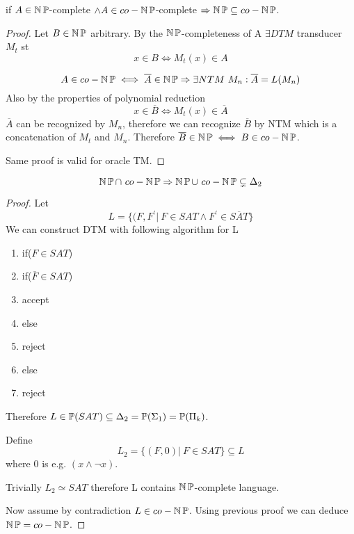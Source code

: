 \begin{theorem}[NP = co-NP]
	if $A \in \TNP$-complete $\land A \in co-\TNP$-complete $\Rightarrow \TNP \subseteq co-\TNP$.
\end{theorem}
\begin{proof}
	Let $B \in \TNP$ arbitrary.
	By the $\TNP$-completeness of A $\exists DTM$ transducer $M_t$ st
	\[ x \in B \iff M_t(x) \in A \]

	\[ A \in co-\TNP \iff \overline{A} \in \TNP \Rightarrow \exists NTM\ M_n: \overline{A} = L(M_n) \]
	Also by the properties of polynomial reduction
	\[ x \in \overline{B} \iff M_t(x) \in \overline{A} \]
	$\overline{A}$ can be recognized by $M_n$, therefore we can recognize $\overline{B}$ by NTM which is a concatenation of $M_t$ and $M_n$.
	Therefore $\overline{B} \in \TNP \iff B \in co-\TNP $.

	Same proof is valid for oracle TM.
\end{proof}

\begin{theorem}[NP $\neq$ co-NP]
	\[ \TNP \cap\ co-\TNP \Rightarrow \TNP \cup\ co-\TNP \subsetneq \Delta_2 \]
\end{theorem}
\begin{proof}
	Let
	\[ L = \{ (F, F^{\prime} |\ F \in SAT \land F^{\prime} \in \overline{SAT} \} \]
	We can construct DTM with following algorithm for L

	\begin{enumerate}
		\item if($F \in SAT$)
		\item \tab if($\overline{F} \in SAT$)
		\item \tab \tab accept
		\item \tab else
		\item \tab \tab reject
		\item else
		\item \tab reject
	\end{enumerate}

	Therefore $L \in \TP(SAT) \subseteq \Delta_2 = \TP(\Sigma_1) = \TP(\Pi_k)$.

	Define
	\[ L_2 = \{ (F, 0)|\ F \in SAT \} \subseteq L \]
	where $0$ is e.g. $(x \land \neg x)$.

	Trivially $ L_2 \simeq SAT$ therefore L contains $\TNP$-complete language.

	Now assume by contradiction $L \in co-\TNP$.
	Using previous proof we can deduce $\TNP = co-\TNP$.
\end{proof}

